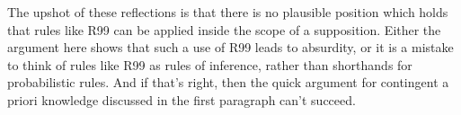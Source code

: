 The upshot of these reflections is that there is no plausible position which holds that rules like R99 can be applied inside the scope of a supposition. Either the argument here shows that such a use of R99 leads to absurdity, or it is a mistake to think of rules like R99 as rules of inference, rather than shorthands for probabilistic rules. And if that's right, then the quick argument for contingent a priori knowledge discussed in the first paragraph can't succeed.
